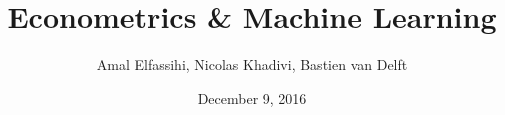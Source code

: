 \documentclass[a4paper]{article}
\begin{document}
\title{Econometrics \& Machine Learning}
\author{Amal Elfassihi, Nicolas Khadivi, Bastien van Delft}
\date{December 9, 2016}
\maketitle
\end{document}
